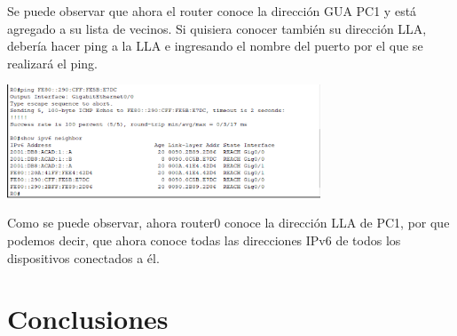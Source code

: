 \documentclass[12pt]{article}
\begin{document}
 Se puede observar que ahora el router conoce la dirección GUA PC1 y está agregado a su lista de vecinos. Si quisiera conocer también su dirección LLA, debería hacer ping a la LLA e ingresando el nombre del puerto por el que se realizará el ping.
 
 \begin{center}
 	\includegraphics[width=0.7\textwidth]{../tpipv6/imagenes/imagen7}
 \end{center}
 
 Como se puede observar, ahora router0 conoce la dirección LLA de PC1, por que podemos decir, que ahora conoce todas las direcciones IPv6 de todos los dispositivos conectados a él.
 
 \section{Conclusiones}
 
\end{document}
